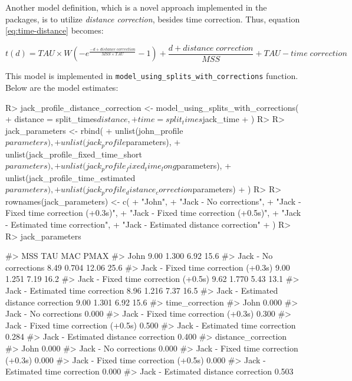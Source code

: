 \documentclass[
]{jss}
\begin{document}
Another model definition, which is a novel approach implemented in the  packages, is to utilize \emph{distance correction}, besides time correction. Thus, equation \eqref{eq:time-distance} becomes:

\begin{equation}
  t(d) = TAU \times W(-e^{\frac{-d + distance \; correction}{MSS \times TAU}} - 1) + \frac{d + distance \; correction}{MSS} + TAU - time \; correction \label{eq:distance-correction}
\end{equation}

This model is implemented in \texttt{model\_using\_splits\_with\_corrections} function. Below are the model estimates:

\begin{CodeChunk}
\begin{CodeInput}
R> jack_profile_distance_correction <- model_using_splits_with_corrections(
+   distance = split_times$distance,
+   time = split_times$jack_time
+ )
R> 
R> jack_parameters <- rbind(
+   unlist(john_profile$parameters),
+   unlist(jack_profile$parameters),
+   unlist(jack_profile_fixed_time_short$parameters),
+   unlist(jack_profile_fixed_time_long$parameters),
+   unlist(jack_profile_time_estimated$parameters),
+   unlist(jack_profile_distance_correction$parameters)
+ )
R> 
R> rownames(jack_parameters) <- c(
+   "John",
+   "Jack - No corrections",
+   "Jack - Fixed time correction (+0.3s)",
+   "Jack - Fixed time correction (+0.5s)",
+   "Jack - Estimated time correction",
+   "Jack - Estimated distance correction"
+ )
R> 
R> jack_parameters
\end{CodeInput}
\begin{CodeOutput}
#>                                       MSS   TAU   MAC PMAX
#> John                                 9.00 1.300  6.92 15.6
#> Jack - No corrections                8.49 0.704 12.06 25.6
#> Jack - Fixed time correction (+0.3s) 9.00 1.251  7.19 16.2
#> Jack - Fixed time correction (+0.5s) 9.62 1.770  5.43 13.1
#> Jack - Estimated time correction     8.96 1.216  7.37 16.5
#> Jack - Estimated distance correction 9.00 1.301  6.92 15.6
#>                                      time_correction
#> John                                           0.000
#> Jack - No corrections                          0.000
#> Jack - Fixed time correction (+0.3s)           0.300
#> Jack - Fixed time correction (+0.5s)           0.500
#> Jack - Estimated time correction               0.284
#> Jack - Estimated distance correction           0.400
#>                                      distance_correction
#> John                                               0.000
#> Jack - No corrections                              0.000
#> Jack - Fixed time correction (+0.3s)               0.000
#> Jack - Fixed time correction (+0.5s)               0.000
#> Jack - Estimated time correction                   0.000
#> Jack - Estimated distance correction               0.503
\end{CodeOutput}
\end{CodeChunk}
\end{document}
